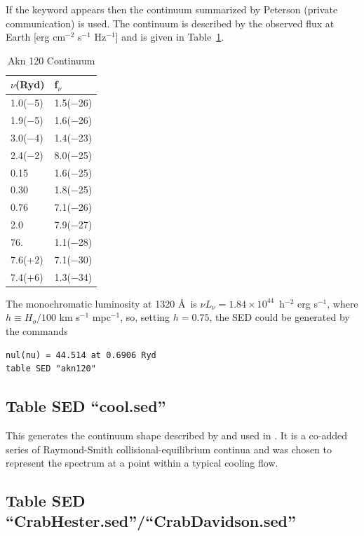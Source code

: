 \noindent If the keyword  appears then the continuum
summarized by Peterson (private communication) is used.
The continuum is described by the observed flux
at Earth [erg cm$^{-2}$ s$^{-1}$ Hz$^{-1}$] and is given in
Table~\ref{tab:Akn120Continuum}.

\begin{table}
\centering
\caption{{Akn 120 Continuum}}
\label{tab:Akn120Continuum}
\begin{tabular}{ll}\hline
$\nu$(Ryd)& f$_\nu$\\
\hline
1.0($-$5)& 1.5($-$26)\\
1.9($-$5)& 1.6($-$26)\\
3.0($-$4)& 1.4($-$23)\\
2.4($-$2)& 8.0($-$25)\\
0.15& 1.6($-$25)\\
0.30& 1.8($-$25)\\
0.76& 7.1($-$26)\\
2.0&  7.9($-$27)\\
76.&  1.1($-$28)\\
7.6($+$2)& 7.1($-$30)\\
7.4($+$6)& 1.3($-$34)\\
\hline
\end{tabular}
\end{table}

The monochromatic luminosity at 1320 \AA\  is
$\nu L_\nu=1.84 \times 10^{44}$~h$^{-2}$ erg s$^{-1}$,
where
$h\equiv H_o/100$ km s$^{-1}$ mpc$^{-1}$, so, setting $h = 0.75$,
the  SED
could be generated by the commands
\begin{verbatim}
nul(nu) = 44.514 at 0.6906 Ryd
table SED "akn120"
\end{verbatim}

\subsection{Table SED ``cool.sed'' }

This generates the continuum shape
described by \citet{Johnstone1992} and used in \citet{Ferland1994,FerlandFabian2002}.  It
is a co-added series of Raymond-Smith collisional-equilibrium continua and
was chosen to represent the spectrum at a point within a typical cooling
flow.

\subsection{Table SED ``CrabHester.sed''/``CrabDavidson.sed''}

